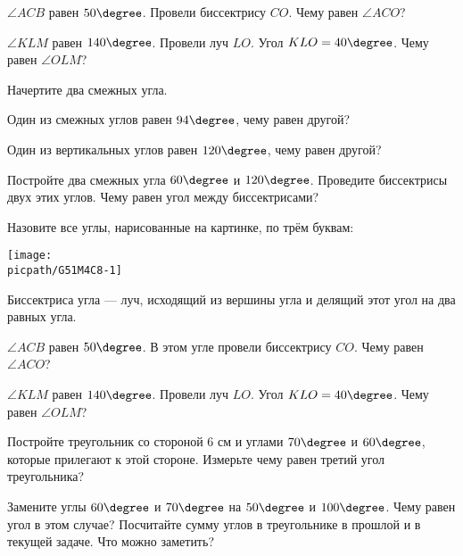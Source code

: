 \begin{class}[number=8]
\begin{listofex}
\begin{center}
 	\end{center}
 	\item \( \angle ACB \) равен \( 50\degree \). Провели биссектрису \( CO \). Чему равен \( \angle ACO \)?
 	\item \( \angle KLM \) равен \( 140\degree \). Провели луч \( LO \). Угол \( KLO=40\degree \). Чему равен \( \angle OLM \)?
		\item Начертите два смежных угла.
		\item Один из смежных углов равен \( 94\degree \), чему равен другой?
		\item Один из вертикальных углов равен \( 120\degree \), чему равен другой?
		\item Постройте два смежных угла \( 60\degree \) и \( 120\degree \). Проведите биссектрисы двух этих углов. Чему равен угол между биссектрисами?
		\item
		\begin{minipage}[t]{\bodywidth}
			Назовите все углы, нарисованные на картинке, по трём буквам:
		\end{minipage}
		\hspace{0.03\linewidth}
		\begin{minipage}[c]{\picwidth}
			\texttt{[image: \\picpath/G51M4C8-1]}
		\end{minipage}
	\end{listofex}
	\begin{definit}
		Биссектриса угла --- луч, исходящий из вершины угла и делящий этот угол на два равных угла.
	\end{definit}
	\begin{listofex}[resume]
		\item \( \angle ACB \) равен \( 50\degree \). В этом угле провели биссектрису \( CO \). Чему равен \( \angle ACO \)?
		\item \( \angle KLM \) равен \( 140\degree \). Провели луч \( LO \). Угол \( KLO=40\degree \). Чему равен \( \angle OLM \)?
		\item Постройте треугольник со стороной \( 6 \) см и углами \( 70\degree \) и \( 60\degree \), которые прилегают к этой стороне. Измерьте чему равен третий угол треугольника?
		\item Замените углы \( 60\degree \) и \( 70\degree \) на \( 50\degree \) и \( 100\degree \). Чему равен угол в этом случае? Посчитайте сумму углов в треугольнике в прошлой и в текущей задаче. Что можно заметить?
	\end{listofex}
\end{class}
